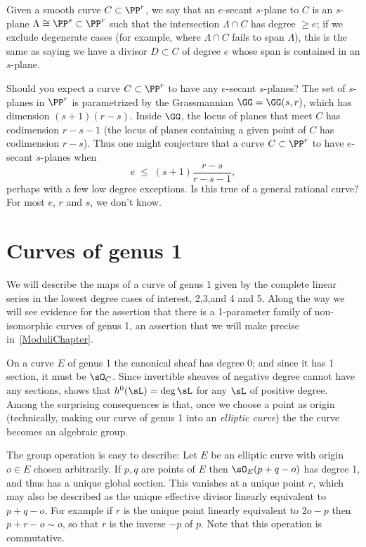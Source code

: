 Given a smooth curve $C \subset \PP^r$, we say that an $e$-secant $s$-plane to $C$ is an $s$-plane $\Lambda \cong \PP^s \subset \PP^r$ such that the intersection $\Lambda \cap C$ has degree $\geq e$; if we exclude degenerate cases (for example, where $\Lambda \cap C$ fails to span $\Lambda$), this is the same as saying we have a divisor $D \subset C$ of degree $e$ whose span is contained in an $s$-plane.

Should you expect a curve $C \subset \PP^r$ to have any $e$-secant $s$-planes? The set of $s$-planes in $\PP^r$ is parametrized by the Grassmannian $\GG = \GG(s,r)$, which has dimension $(s+1)(r-s)$. Inside $\GG$, the locus of planes that meet $C$ has codimension $r-s-1$ (the locus of planes containing a given point of $C$ has codimension $r-s$). Thus one might conjecture that a curve $C \subset \PP^r$ to have $e$-secant $s$-planes when 
$$
e \; \leq \; (s+1)\frac{r-s}{r-s-1},
$$
perhaps with a few low degree exceptions. Is this true of a general rational curve? For most $e$, $r$ and $s$, we don't know.

\section{Curves of genus 1}

We will describe the maps of a curve of genus 1 given by
the complete linear series in the lowest degree cases of interest, 2,3,and 4 and 5. Along the
way we will see evidence for the assertion that there is a 1-parameter family of non-isomorphic
curves of genus 1, an assertion that we will make precise in~\ref{ModuliChapter}.


On a curve $E$ of genus 1 the canonical sheaf has degree 0; and since it has 1 section, it must be $\sO_C$.
Since invertible sheaves of negative degree cannot have any sections, \trr shows that
$h^0( \sL) = \deg \sL$ for any $\sL$ of positive degree. Among the surprising consequences is that, once we choose a point as 
origin (technically, making our curve of genus 1 into an \emph{elliptic curve}) the  the curve becomes
an algebraic group. 

The group operation is easy to describe:
Let $E$ be an elliptic curve with origin $o\in E$ chosen arbitrarily. If $p,q$ are points of $E$ then $\sO_E(p+q-o)$ has degree 1, and
thus has a unique global section. This vanishes at a unique point $r$, which may also be described as the unique
effective divisor linearly equivalent to $p+q-o$. For example if $r$ is the  unique point
linearly equivalent to $2o-p$ then $p+r-o\sim o$, so that $r$ is the inverse $-p$ of $p$. Note that this operation is commutative.

